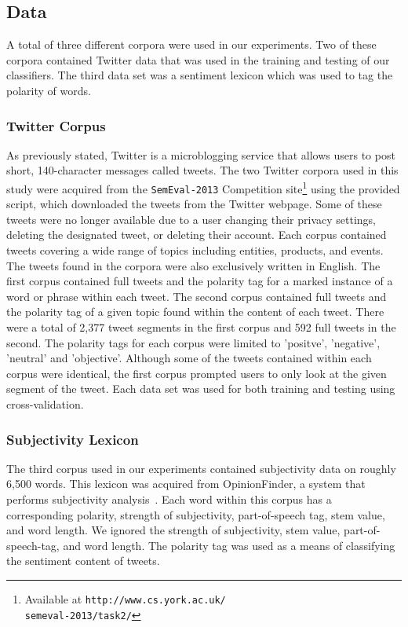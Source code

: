 \documentclass[11pt]{article}
\begin{document}
\subsection{Data}
A total of three different corpora were used in our experiments. Two of these corpora contained Twitter data that was used in the training and testing of our classifiers. The third data set was a sentiment lexicon which was used to tag the polarity of words.

\subsubsection*{Twitter Corpus}
As previously stated, Twitter is a microblogging service that allows users to post short, 140-character messages called tweets.  The two Twitter corpora used in this study were acquired from the {\tt SemEval-2013} Competition site\footnote{Available at {\tt http://www.cs.york.ac.uk/{\\}semeval-2013/task2/}} using the provided script, which downloaded the tweets from the Twitter webpage. Some of these tweets were no longer available due to a user changing their privacy settings, deleting the designated tweet, or deleting their account. Each corpus contained tweets covering a wide range of topics including entities, products, and events. The tweets found in the corpora were also exclusively written in English. The first corpus contained full tweets and the polarity tag for a marked instance of a word or phrase within each tweet. The second corpus contained full tweets and the polarity tag of a given topic found within the content of each tweet. There were a total of 2,377 tweet segments in the first corpus and 592 full tweets in the second. The polarity tags for each corpus were limited to 'positve', 'negative', 'neutral' and 'objective'. Although some of the tweets contained within each corpus were identical, the first corpus prompted users to only look at the given segment of the tweet. Each data set was used for both training and testing using cross-validation.      

\subsubsection*{Subjectivity Lexicon}
The third corpus used in our experiments contained subjectivity data on roughly 6,500 words. This lexicon was acquired from OpinionFinder, a system that performs subjectivity analysis~\cite{wilson2005opinionfinder}. Each word within this corpus has a corresponding polarity, strength of subjectivity, part-of-speech tag, stem value, and word length. We ignored the strength of subjectivity, stem value, part-of-speech-tag, and word length. The polarity tag was used as a means of classifying the sentiment content of tweets.
\end{document}
